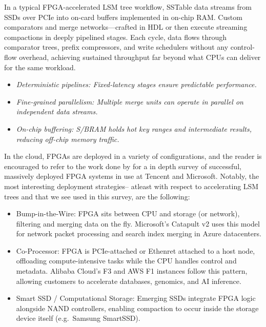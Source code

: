 \documentclass[sigconf]{acmart}
\begin{document}
  In a typical FPGA-accelerated LSM tree workflow, SSTable data streams from SSDs over PCIe into on-card buffers implemented in on-chip RAM. 
  Custom comparators and merge networks—crafted in HDL or then execute streaming compactions in deeply pipelined stages.  
  Each cycle, data flows through comparator trees, prefix compressors, and write schedulers without any control-flow overhead, achieving sustained throughput far beyond what CPUs can deliver for the same workload. \cite{zhang2020fpga}

  \begin{itemize}
    \item \em Deterministic pipelines: Fixed-latency stages ensure predictable performance.  
    \item \em Fine-grained \em parallelism: Multiple merge units can operate in parallel on independent data streams.  
    \item \em On-chip buffering: S/BRAM holds hot key ranges and intermediate results, reducing off-chip memory traffic.  
  \end{itemize}

  In the cloud, FPGAs are deployed in a variety of configurations, and the reader is encouraged to refer to the work done by \cite{bobda2022future} for a in depth survey of successful, massively deployed FPGA systems in use at Tencent and Microsoft. 
  Notably, the most interesting deployment strategies-- atleast with respect to accelerating LSM trees and that we see used in this survey, are the following:
   \begin{itemize}
    \item Bump-in-the-Wire: FPGA sits between CPU and storage (or network), filtering and merging data on the fly.  Microsoft’s Catapult v2 uses this model for network packet processing and search index merging in Azure datacenters. \cite{bobda2022future}
    \item Co-Processor: FPGA is PCIe-attached or Ethenret attached to a host node, offloading compute-intensive tasks while the CPU handles control and metadata.  Alibaba Cloud’s F3 and AWS F1 instances follow this pattern, allowing customers to accelerate databases, genomics, and AI inference. \cite{bobda2022future}
    \item Smart SSD / Computational Storage: Emerging SSDs integrate FPGA logic alongside NAND controllers, enabling compaction to occur inside the storage device itself (e.g.\ Samsung SmartSSD).  
  \end{itemize}
\end{document}
